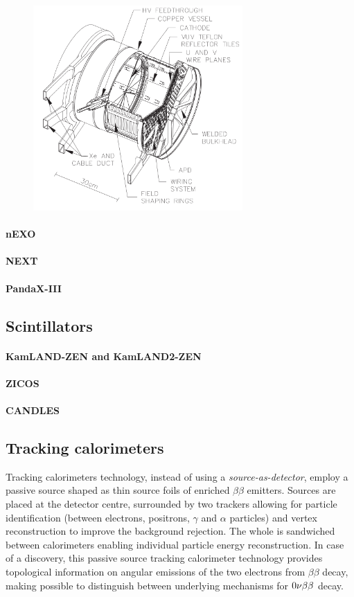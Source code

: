 \begin{figure}
  \centering
  \includegraphics[width=8cm]{neutrinophysics/fig_neutrinophysics/EXO-200.png}
  \caption{\label{fig:EXO-200}}

\end{figure}

\paragraph{nEXO}
\paragraph{NEXT}
\paragraph{PandaX-III}
\subsection{Scintillators}
\label{subsec:scintillators}
\paragraph{KamLAND-ZEN and KamLAND2-ZEN}
\paragraph{ZICOS}
\paragraph{CANDLES}
\subsection{Tracking calorimeters}
\label{subsec:trackocalo}
Tracking calorimeters technology, instead of using a \emph{source-as-detector}, employ a passive source shaped as thin source foils of enriched $\beta\beta$ emitters.
Sources are placed at the detector centre, surrounded by two trackers allowing for particle identification (between electrons, positrons, $\gamma$ and $\alpha$ particles) and vertex reconstruction to improve the background rejection.
The whole is sandwiched between calorimeters enabling individual particle energy reconstruction.
In case of a discovery, this passive source tracking calorimeter technology provides topological information on angular emissions of the two electrons from $\beta\beta$ decay, making possible to distinguish between underlying mechanisms for $0\nu\beta\beta$ decay.

